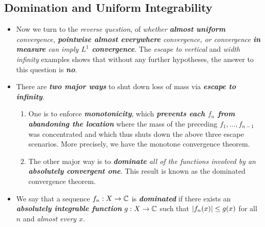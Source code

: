 \documentclass[11pt]{article}
\begin{document}
\subsection{Domination and Uniform Integrability}
\begin{itemize}
\item \begin{remark}
Now we turn to the \emph{reverse question}, of \emph{whether \textbf{almost uniform} convergence, \textbf{pointwise almost everywhere} convergence, or convergence \textbf{in measure} can imply \textbf{$L^1$ convergence}}. The \emph{escape to vertical} and \emph{width infinity} examples shows that without any further hypotheses, the answer to this question is \emph{\textbf{no}}. 
\end{remark}


\item \begin{remark} \citep{tao2011introduction} 
There are \emph{\textbf{two major ways}} to shut down loss of mass via \emph{\textbf{escape to infinity}}.
\begin{enumerate}
\item One is to enforce \emph{\textbf{monotonicity}}, which \emph{\textbf{prevents each $f_n$ from abandoning the location}} where the
mass of the preceding $f_1, \ldots , f_{n-1}$ was concentrated and which thus shuts down the above three escape scenarios. More precisely, we have the monotone convergence theorem.

\item The other major way is to \emph{\textbf{dominate} all of the functions involved by an \textbf{absolutely convergent one}}. This result is known as the dominated convergence theorem. 
\end{enumerate} 
\end{remark}

\item \begin{definition}
We say that a sequence $f_n : X \rightarrow {\mathbb C}$ is \emph{\textbf{dominated}} if there exists an \emph{\textbf{absolutely integrable function}} $g : X \rightarrow {\mathbb C}$ such that $\left\lvert f_n(x) \right\rvert \le g(x)$ for all $n$ and \emph{almost every $x$}. 
\end{definition}


\end{itemize}
\end{document}
